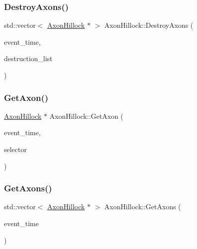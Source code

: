 \mbox{\label{classAxonHillock_a083c918c64c60f3cea1d39aa8e0c6fba}} 
\subsubsection{\texorpdfstring{Destroy\+Axons()}{DestroyAxons()}}
{\footnotesize\ttfamily std\+::vector$<$ \mbox{\hyperlink{classAxonHillock}{Axon\+Hillock}} $\ast$ $>$ Axon\+Hillock\+::\+Destroy\+Axons (\begin{DoxyParamCaption}\item[{std\+::chrono\+::time\+\_\+point$<$ \mbox{\hyperlink{universe_8h_a0ef8d951d1ca5ab3cfaf7ab4c7a6fd80}{Clock}} $>$}]{event\+\_\+time,  }\item[{std\+::vector$<$ \mbox{\hyperlink{classAxonHillock}{Axon\+Hillock}} $\ast$$>$}]{destruction\+\_\+list }\end{DoxyParamCaption})}

\mbox{\label{classAxonHillock_a08fde7d1b8a40ba7a052315f95b743f0}} 
\subsubsection{\texorpdfstring{Get\+Axon()}{GetAxon()}}
{\footnotesize\ttfamily \mbox{\hyperlink{classAxonHillock}{Axon\+Hillock}} $\ast$ Axon\+Hillock\+::\+Get\+Axon (\begin{DoxyParamCaption}\item[{std\+::chrono\+::time\+\_\+point$<$ \mbox{\hyperlink{universe_8h_a0ef8d951d1ca5ab3cfaf7ab4c7a6fd80}{Clock}} $>$}]{event\+\_\+time,  }\item[{int}]{selector }\end{DoxyParamCaption})}

\mbox{\label{classAxonHillock_af35663768cbe818e092382519a6d73e3}} 
\subsubsection{\texorpdfstring{Get\+Axons()}{GetAxons()}}
{\footnotesize\ttfamily std\+::vector$<$ \mbox{\hyperlink{classAxonHillock}{Axon\+Hillock}} $\ast$ $>$ Axon\+Hillock\+::\+Get\+Axons (\begin{DoxyParamCaption}\item[{std\+::chrono\+::time\+\_\+point$<$ \mbox{\hyperlink{universe_8h_a0ef8d951d1ca5ab3cfaf7ab4c7a6fd80}{Clock}} $>$}]{event\+\_\+time }\end{DoxyParamCaption})}

